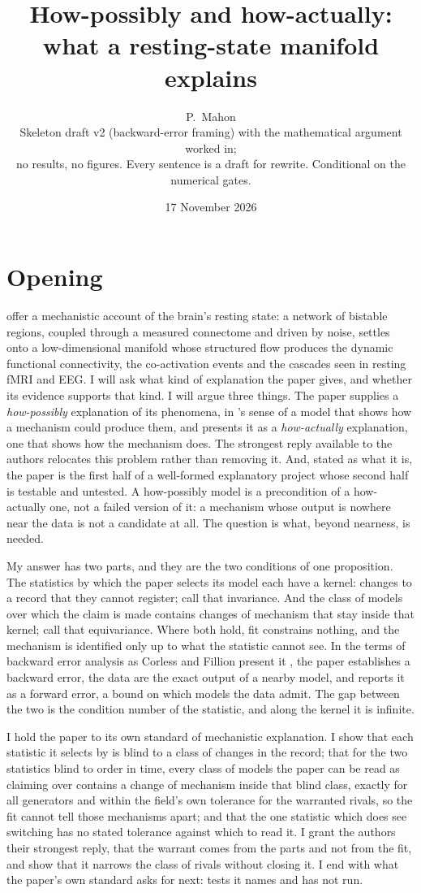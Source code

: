 \documentclass[11pt]{article}
\title{How-possibly and how-actually:\\ what a resting-state manifold explains}
\author{P.~Mahon \\ \small Skeleton draft v2 (backward-error framing) with the mathematical argument worked in; \\ \small no results, no figures. Every sentence is a draft for rewrite. Conditional on the numerical gates.}
\date{17 November 2026}
\begin{document}
\maketitle

\section*{Opening}
\textcite{fousek2024} offer a mechanistic account of the brain's resting state: a network of bistable regions, coupled through a measured connectome and driven by noise, settles onto a low-dimensional manifold whose structured flow produces the dynamic functional connectivity, the co-activation events and the cascades seen in resting fMRI and EEG. I will ask what kind of explanation the paper gives, and whether its evidence supports that kind. I will argue three things. The paper supplies a \emph{how-possibly} explanation of its phenomena, in \textcite{craver2006}'s sense of a model that shows how a mechanism could produce them, and presents it as a \emph{how-actually} explanation, one that shows how the mechanism does. The strongest reply available to the authors relocates this problem rather than removing it. And, stated as what it is, the paper is the first half of a well-formed explanatory project whose second half is testable and untested. A how-possibly model is a precondition of a how-actually one, not a failed version of it: a mechanism whose output is nowhere near the data is not a candidate at all. The question is what, beyond nearness, is needed.

My answer has two parts, and they are the two conditions of one proposition. The statistics by which the paper selects its model each have a kernel: changes to a record that they cannot register; call that invariance. And the class of models over which the claim is made contains changes of mechanism that stay inside that kernel; call that equivariance. Where both hold, fit constrains nothing, and the mechanism is identified only up to what the statistic cannot see. In the terms of backward error analysis as Corless and Fillion present it \parencite{corless2016,fillion2014}, the paper establishes a backward error, the data are the exact output of a nearby model, and reports it as a forward error, a bound on which models the data admit. The gap between the two is the condition number of the statistic, and along the kernel it is infinite.

I hold the paper to its own standard of mechanistic explanation. I show that each statistic it selects by is blind to a class of changes in the record; that for the two statistics blind to order in time, every class of models the paper can be read as claiming over contains a change of mechanism inside that blind class, exactly for all generators and within the field's own tolerance for the warranted rivals, so the fit cannot tell those mechanisms apart; and that the one statistic which does see switching has no stated tolerance against which to read it. I grant the authors their strongest reply, that the warrant comes from the parts and not from the fit, and show that it narrows the class of rivals without closing it. I end with what the paper's own standard asks for next: tests it names and has not run.
\end{document}
